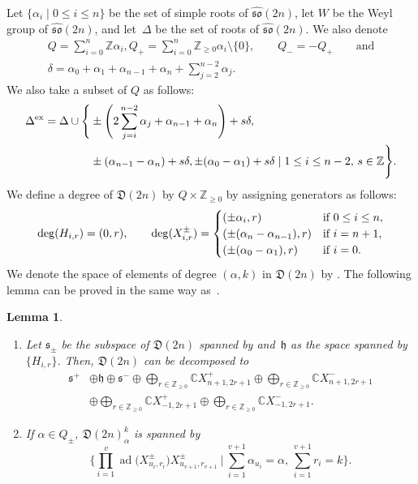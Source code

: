 \documentclass[10pt,a4paper]{amsart}
\numberwithin{equation}{section}
\newtheorem{Lemma}[Theorem]{Lemma}
\theoremstyle{definition}
\DeclareMathOperator{\ad}{ad}
\begin{document}
Let $\{\alpha_i\mid0\leq i\leq n\}$ be the set of simple roots of $\widehat{\mathfrak{so}}(2n)$, let $W$ be the Weyl group of $\widehat{\mathfrak{so}}(2n)$, and let~$\Delta$ be the set of roots of $\widehat{\mathfrak{so}}(2n)$. We also denote
\begin{gather*}
Q=\sum_{i=0}^n \mathbb{Z}\alpha_i,Q_+=\sum_{i=0}^n \mathbb{Z}_{\geq0}\alpha_i\setminus\{0\},\qquad Q_-=-Q_+\qquad \text{and}\\ \delta=\alpha_0+\alpha_1+\alpha_{n-1}+\alpha_n+\sum_{j=2}^{n-2} \alpha_j.
\end{gather*} We also take a subset of $Q$ as follows:
\begin{align*}
\Delta^{{\rm ex}}=\Delta\cup\Biggl\{&\pm\Bigg(2\sum_{j=i}^{n-2}\alpha_j+\alpha_{n-1}+\alpha_n\Biggr)+s\delta,\\
&\pm(\alpha_{n-1}-\alpha_n)+s\delta,\pm(\alpha_0-\alpha_1)+s\delta\mid 1\leq i\leq n-2,\,s\in\mathbb{Z}\Biggr\}.
\end{align*}
We define a degree of $\mathfrak{D}(2n)$ by $Q\times\mathbb{Z}_{\geq0}$ by assigning generators as follows:
\begin{gather*}
{\rm deg}(H_{i,r})=(0,r),\qquad {\rm deg}(X^\pm_{i,r})=\begin{cases}
(\pm\alpha_i,r)&\text{if }0\leq i\leq n,\\
(\pm(\alpha_{n}-\alpha_{n-1}),r)&\text{if }i=n+1,\\
(\pm(\alpha_{0}-\alpha_1),r)&\text{if }i=0.
\end{cases}
\end{gather*}
We denote the space of elements of degree $(\alpha,k)$ in $\mathfrak{D}(2n)$ by . The following lemma can be proved in the same way as~\cite[Lemma 3.1]{MRY}.
\begin{Lemma}\label{Lem128}\qquad
\begin{enumerate}\itemsep=0pt
\item[$(1)$] Let $\mathfrak{s}_\pm$ be the subspace of $\mathfrak{D}(2n)$ spanned by \smash{$\bigl\{\prod_{i=1}^v\ad\bigl(X^\pm_{u_i,r_i}\bigr)X^\pm_{u_{v+1},r_{v+1}}\bigr\}$}
and~$\mathfrak{h}$ as the space spanned by $\{H_{i,r}\}$. Then, $\mathfrak{D}(2n)$ can be decomposed to
\begin{align*}
\mathfrak{s}^+& \oplus\mathfrak{h}\oplus\mathfrak{s}^-\oplus \bigoplus_{r\in\mathbb{Z}_{\geq0}}\mathbb{C}X^+_{n+1,2r+1}\oplus \bigoplus_{r\in\mathbb{Z}_{\geq0}}\mathbb{C}X^-_{n+1,2r+1}\\
& \oplus \bigoplus_{r\in\mathbb{Z}_{\geq0}}\mathbb{C}X^+_{-1,2r+1}\oplus \bigoplus_{r\in\mathbb{Z}_{\geq0}}\mathbb{C}X^-_{-1,2r+1}.
\end{align*}
\item[$(2)$] If $\alpha\in Q_{\pm}$, $\mathfrak{D}(2n)_\alpha^k$ is spanned by
\begin{equation*}
\Biggl\{\prod_{i=1}^v\ad\bigl(X^\pm_{u_i,r_i}\bigr)X^\pm_{u_{v+1},r_{v+1}}\:\bigg|\: \sum_{i=1}^{v+1}\alpha_{u_i}=\alpha,\,\sum_{i=1}^{v+1}r_i=k\Biggr\}.
\end{equation*}
\end{enumerate}
\end{Lemma}
\end{document}
